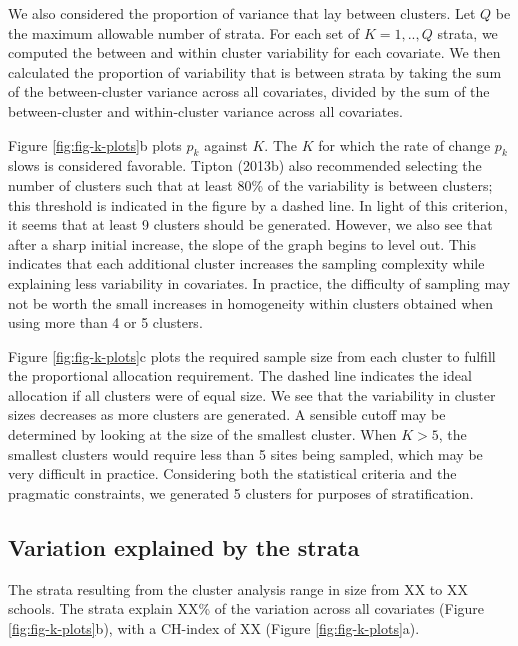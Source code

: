 \documentclass[
  english,
  man,floatsintext]{apa6}
\begin{document}
We also considered the proportion of variance that lay between clusters. Let \(Q\) be the maximum allowable number of strata. For each set of \(K = 1,..,Q\) strata, we computed the between and within cluster variability for each covariate. We then calculated the proportion of variability that is between strata by taking the sum of the between-cluster variance across all covariates, divided by the sum of the between-cluster and within-cluster variance across all covariates.

Figure \ref{fig:fig-k-plots}b plots \(p_k\) against \(K\). The \(K\) for which the rate of change \(p_k\) slows is considered favorable. Tipton (2013b) also recommended selecting the number of clusters such that at least 80\% of the variability is between clusters; this threshold is indicated in the figure by a dashed line. In light of this criterion, it seems that at least 9 clusters should be generated. However, we also see that after a sharp initial increase, the slope of the graph begins to level out. This indicates that each additional cluster increases the sampling complexity while explaining less variability in covariates. In practice, the difficulty of sampling may not be worth the small increases in homogeneity within clusters obtained when using more than 4 or 5 clusters.

Figure \ref{fig:fig-k-plots}c plots the required sample size from each cluster to fulfill the proportional allocation requirement. The dashed line indicates the ideal allocation if all clusters were of equal size. We see that the variability in cluster sizes decreases as more clusters are generated. A sensible cutoff may be determined by looking at the size of the smallest cluster. When \(K > 5\), the smallest clusters would require less than 5 sites being sampled, which may be very difficult in practice. Considering both the statistical criteria and the pragmatic constraints, we generated 5 clusters for purposes of stratification.

\hypertarget{variation-explained-by-the-strata}{%
\subsection{Variation explained by the strata}\label{variation-explained-by-the-strata}}

The strata resulting from the cluster analysis range in size from XX to XX schools. The strata explain XX\% of the variation across all covariates (Figure \ref{fig:fig-k-plots}b), with a CH-index of XX (Figure \ref{fig:fig-k-plots}a).
\end{document}
